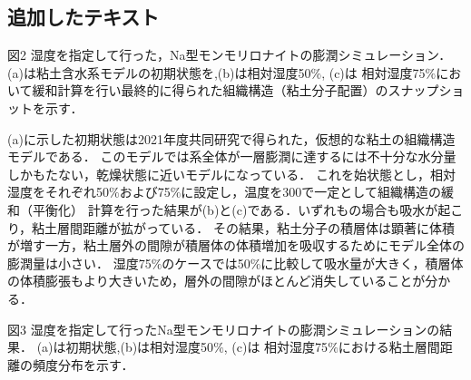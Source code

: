 \subsection{追加したテキスト}
図2
湿度を指定して行った，Na型モンモリロナイトの膨潤シミュレーション．(a)は粘土含水系モデルの初期状態を,(b)は相対湿度50$\%$, 
(c)は 相対湿度75$\%$において緩和計算を行い最終的に得られた組織構造（粘土分子配置）のスナップショットを示す．

(a)に示した初期状態は2021年度共同研究で得られた，仮想的な粘土の組織構造モデルである．
このモデルでは系全体が一層膨潤に達するには不十分な水分量しかもたない，乾燥状態に近いモデルになっている．
これを始状態とし，相対湿度をそれぞれ50$\%$および75$\%$に設定し，温度を300で一定として組織構造の緩和（平衡化）
計算を行った結果が(b)と(c)である．いずれもの場合も吸水が起こり，粘土層間距離が拡がっている．
その結果，粘土分子の積層体は顕著に体積が増す一方，粘土層外の間隙が積層体の体積増加を吸収するためにモデル全体の膨潤量は小さい．
湿度75$\%$のケースでは50$\%$に比較して吸水量が大きく，積層体の体積膨張もより大きいため，層外の間隙がほとんど消失していることが分かる．

図3
湿度を指定して行ったNa型モンモリロナイトの膨潤シミュレーションの結果．
(a)は初期状態,(b)は相対湿度50$\%$, (c)は 相対湿度75$\%$における粘土層間距離の頻度分布を示す．

